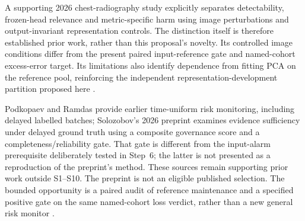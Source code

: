 \documentclass[11pt,a4paper]{article}
\begin{document}
A supporting 2026 chest-radiography study explicitly separates detectability,
frozen-head relevance and metric-specific harm using image perturbations and
output-invariant representation controls. The distinction itself is therefore
established prior work, rather than this proposal's novelty. Its controlled
image conditions differ from the present paired input-reference gate and
named-cohort excess-error target. Its limitations also identify dependence
from fitting PCA on the reference pool, reinforcing the independent
representation-development partition proposed here \cite{badea}.

Podkopaev and Ramdas provide earlier time-uniform risk monitoring, including
delayed labelled batches; Solozobov's 2026 preprint examines evidence
sufficiency under delayed ground truth using a composite governance score
and a completeness/reliability gate. That gate is different from the
input-alarm prerequisite deliberately tested in Step~6; the latter is not
presented as a reproduction of the preprint's method.
These sources remain supporting prior work
outside S1--S10. The preprint is not an eligible published selection. The
bounded opportunity is a paired audit of reference maintenance and a specified
positive gate on the same named-cohort loss verdict, rather than a new general
risk monitor \cite{podkopaev,solozobov}.
\end{document}
